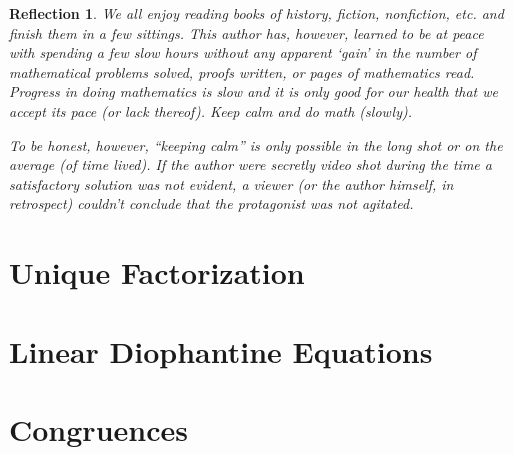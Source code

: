 \documentclass[english,notitlepage,smartquotes]{hgbreport}
\theoremstyle{definition}
\theoremstyle{remark}
\theoremstyle{plain}
\newtheorem{reflection}{Reflection}
\begin{document}
\begin{enumerate}[label=\textbf{\arabic*}.]
\begin{enumerate}
\begin{reflection}
We all enjoy reading books of history, fiction, nonfiction, etc. and finish them in a few sittings. This author has, however, learned to be at peace with spending a few slow hours without any apparent `gain' in the number of mathematical problems solved, proofs written, or pages of mathematics read. Progress in doing mathematics is slow and it is only good for our health that we accept its pace (or lack thereof). Keep calm and do math (slowly).

To be honest, however, ``keeping calm'' is only possible in the long shot or on the average (of time lived). If the author were secretly video shot during the time a satisfactory solution was not evident, a viewer (or the author himself, in retrospect) couldn't conclude that the protagonist was not agitated.
\end{reflection}
\end{enumerate}
\end{enumerate}
\chapter{Unique Factorization}

\chapter{Linear Diophantine Equations}

\chapter{Congruences}

\appendix                                                   %

\end{document}
